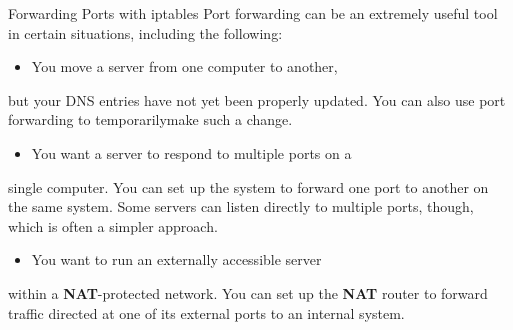 \begin{frame}[t,allowframebreaks]{Forwarding Ports with iptables}
  \fontsize{15}{18}\selectfont
  Port forwarding can be an extremely useful tool in certain situations, including the following:\par
  \begin{itemize}
    \item You move a server from one computer to another,
  \end{itemize}
  but your DNS entries have not yet been properly updated. You can also use port forwarding to temporarilymake such a change.\par
  \begin{itemize}
    \item You want a server to respond to multiple ports on a
  \end{itemize}
  single computer. You can set up the system to forward one port to another on the same system. Some servers can listen directly to multiple ports, though, which is often a simpler approach.\par
  \begin{itemize}
    \item You want to run an externally accessible server
  \end{itemize}
  within a \textcolor{CommandGreen}{\bfseries NAT}-protected network. You can set up the \textcolor{CommandGreen}{\bfseries NAT} router to forward traffic directed at one of its external ports to an internal system.\par
\end{frame}
